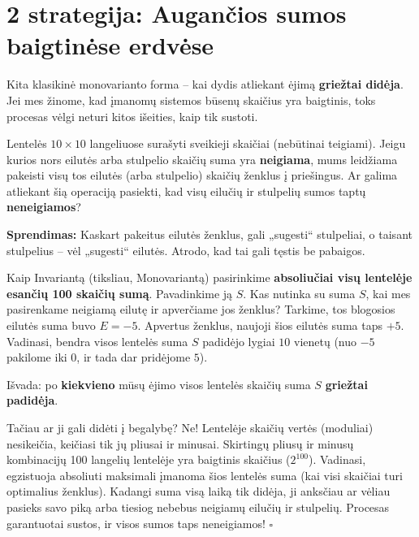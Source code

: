 \documentclass[11pt,a4paper]{scrartcl}
\newenvironment{solution}
    {\begin{list}{}{\setlength{\leftmargin}{10pt}\setlength{\rightmargin}{10pt}}\item[]}
    {\end{list}}
\begin{document}
\section{2 strategija: Augančios sumos baigtinėse erdvėse}

Kita klasikinė monovarianto forma – kai dydis atliekant ėjimą \textbf{griežtai didėja}. Jei mes žinome, kad įmanomų sistemos būsenų skaičius yra baigtinis, toks procesas vėlgi neturi kitos išeities, kaip tik sustoti.

\begin{example}
Lentelės $10 \times 10$ langeliuose surašyti sveikieji skaičiai (nebūtinai teigiami). Jeigu kurios nors eilutės arba stulpelio skaičių suma yra \textbf{neigiama}, mums leidžiama pakeisti visų tos eilutės (arba stulpelio) skaičių ženklus į priešingus. Ar galima atliekant šią operaciją pasiekti, kad visų eilučių ir stulpelių sumos taptų \textbf{neneigiamos}?
\end{example}

\begin{solution}
\textbf{Sprendimas:}
Kaskart pakeitus eilutės ženklus, gali „sugesti“ stulpeliai, o taisant stulpelius – vėl „sugesti“ eilutės. Atrodo, kad tai gali tęstis be pabaigos. 

Kaip Invariantą (tiksliau, Monovariantą) pasirinkime \textbf{absoliučiai visų lentelėje esančių 100 skaičių sumą}. Pavadinkime ją $S$.
Kas nutinka su suma $S$, kai mes pasirenkame neigiamą eilutę ir apverčiame jos ženklus? 
Tarkime, tos blogosios eilutės suma buvo $E = -5$. Apvertus ženklus, naujoji šios eilutės suma taps $+5$.
Vadinasi, bendra visos lentelės suma $S$ padidėjo lygiai $10$ vienetų (nuo $-5$ pakilome iki $0$, ir tada dar pridėjome $5$).

Išvada: po \textbf{kiekvieno} mūsų ėjimo visos lentelės skaičių suma $S$ \textbf{griežtai padidėja}. 

Tačiau ar ji gali didėti į begalybę? Ne! Lentelėje skaičių vertės (moduliai) nesikeičia, keičiasi tik jų pliusai ir minusai. Skirtingų pliusų ir minusų kombinacijų 100 langelių lentelėje yra baigtinis skaičius ($2^{100}$). Vadinasi, egzistuoja absoliuti maksimali įmanoma šios lentelės suma (kai visi skaičiai turi optimalius ženklus).
Kadangi suma visą laiką tik didėja, ji anksčiau ar vėliau pasieks savo piką arba tiesiog nebebus neigiamų eilučių ir stulpelių. Procesas garantuotai sustos, ir visos sumos taps neneigiamos! \hfill $\square$
\end{solution}
\end{document}
